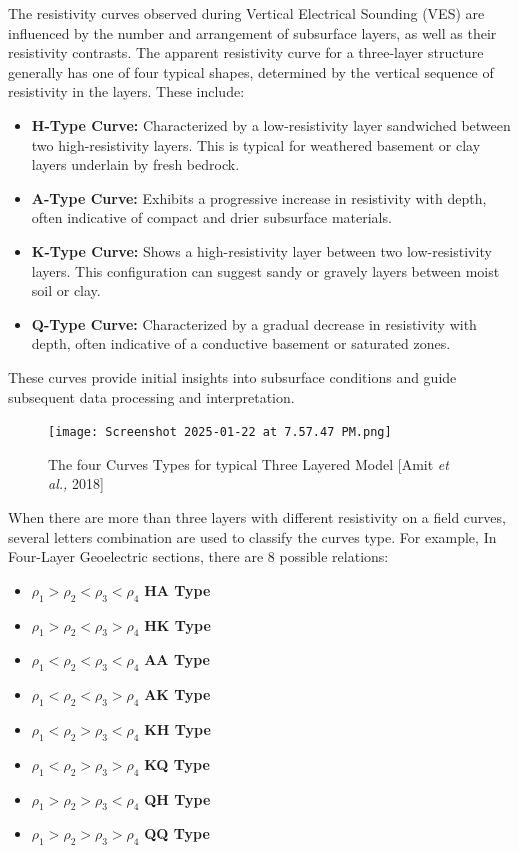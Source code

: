 \documentclass[12pt,a4paper]{report}
\begin{document}
The resistivity curves observed during Vertical Electrical Sounding (VES) are influenced by the number and arrangement of subsurface layers, as well as their resistivity contrasts. The apparent resistivity curve for a three-layer structure generally has one of four typical shapes, determined by the vertical sequence of resistivity in the layers. These include:
\begin{itemize}
    \item \textbf{H-Type Curve:} Characterized by a low-resistivity layer sandwiched between two high-resistivity layers. This is typical for weathered basement or clay layers underlain by fresh bedrock.
    \item \textbf{A-Type Curve:} Exhibits a progressive increase in resistivity with depth, often indicative of compact and drier subsurface materials.
    \item \textbf{K-Type Curve:} Shows a high-resistivity layer between two low-resistivity layers. This configuration can suggest sandy or gravely layers between moist soil or clay.
    \item \textbf{Q-Type Curve:} Characterized by a gradual decrease in resistivity with depth, often indicative of a conductive basement or saturated zones.
\end{itemize}

These curves provide initial insights into subsurface conditions and guide subsequent data processing and interpretation.

\begin{figure}[H]
    \centering
    \texttt{[image: Screenshot 2025-01-22 at 7.57.47 PM.png]}
    \caption{The four Curves Types for typical Three Layered Model [Amit \textit{et al.,} 2018] }
    \label{fig:Four_Curves_Model}
\end{figure}

When there are more than three layers with different resistivity on a field curves, several letters combination are used to classify the curves type. For example, In Four-Layer Geoelectric sections, there are 8 possible relations: 

\begin{itemize}
    \item \(\rho_1 > \rho_2 < \rho_3 < \rho_4\) \textbf{HA Type}
    \item \(\rho_1 > \rho_2 < \rho_3 > \rho_4\) \textbf{HK Type}
    \item \(\rho_1 < \rho_2 < \rho_3 < \rho_4\) \textbf{AA Type}
    \item \(\rho_1 < \rho_2 < \rho_3 > \rho_4\) \textbf{AK Type}
    \item \(\rho_1 < \rho_2 > \rho_3 < \rho_4\) \textbf{KH Type}
    \item \(\rho_1 < \rho_2 > \rho_3 > \rho_4\) \textbf{KQ Type}
    \item \(\rho_1 > \rho_2 > \rho_3 < \rho_4\) \textbf{QH Type}
    \item \(\rho_1 > \rho_2 > \rho_3 > \rho_4\) \textbf{QQ Type}
\end{itemize}
\end{document}

